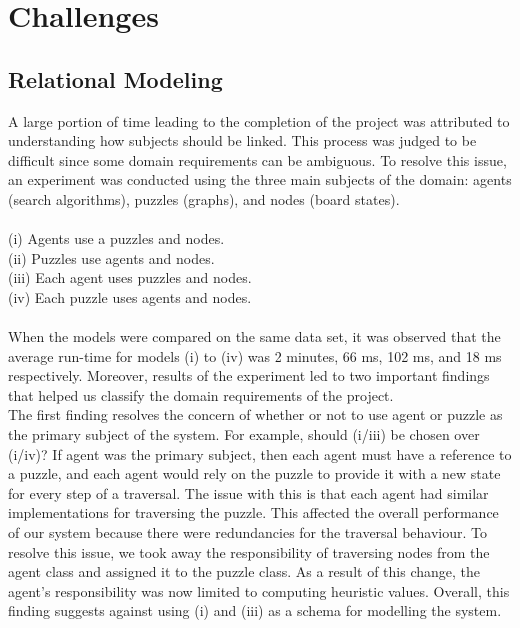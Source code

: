 \section{Challenges}

\subsection{Relational Modeling}

A large portion of time leading to the completion of the project was attributed to understanding how subjects should be linked. This process was judged to be difficult since some domain requirements can be ambiguous. To resolve this issue, an experiment was conducted using the three main subjects of the domain: agents (search algorithms), puzzles (graphs), and nodes (board states).
\\
\\

(i) Agents use a puzzles and nodes. 
\\

(ii) Puzzles use agents and nodes.
\\

(iii) Each agent uses puzzles and nodes.
\\

(iv) Each puzzle uses agents and nodes.
\\
\\

When the models were compared on the same data set, it was observed that the average run-time for models (i) to (iv) was 2 minutes, 66 ms, 102 ms, and 18 ms respectively.  Moreover, results of the experiment led to two important findings that helped us classify the domain requirements of the project.\\

The first finding resolves the concern of whether or not to use agent or puzzle as the primary subject of the system. For example, should (i/iii) be chosen over (i/iv)? If agent was the primary subject, then each agent must have a reference to a puzzle, and each agent would rely on the puzzle to provide it with a new state for every step of a traversal. The issue with this is that each agent had similar implementations for traversing the puzzle. This affected the overall performance of our system because there were redundancies for the traversal behaviour. To resolve this issue, we took away the responsibility of traversing nodes from the agent class and assigned it to the puzzle class. As a result of this change, the agent's responsibility was now limited to computing heuristic values. Overall, this finding suggests against using (i) and (iii) as a schema for modelling the system.\\

